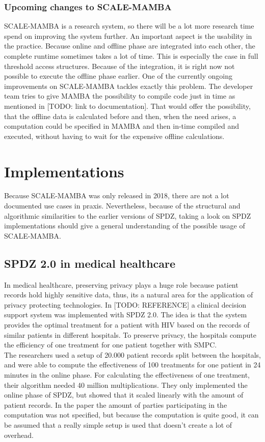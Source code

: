 \documentclass[english,runningheads,a4paper]{llncs}[2018/03/10]
\begin{document}
\subsubsection{Upcoming changes to SCALE-MAMBA}
SCALE-MAMBA is a research system, so there will be a lot more research time spend on improving the system further. An important aspect is the usability in the practice. Because online and offline phase are integrated into each other, the complete runtime sometimes takes a lot of time. This is especially the case in full threshold access structures. Because of the integration, it is right now not possible to execute the offline phase earlier. One of the currently ongoing improvements on SCALE-MAMBA tackles exactly this problem. The developer team tries to give MAMBA the possibility to compile code just in time as mentioned in [TODO: link to documentation]. That would offer the possibility, that the offline data is calculated before and then, when the need arises, a computation could be specified in MAMBA and then in-time compiled and executed, without having to wait for the expensive offline calculations.\\

\section{Implementations}
Because SCALE-MAMBA was only released in 2018, there are not a lot documented use cases in praxis. Nevertheless, because of the structural and algorithmic similarities to the earlier versions of SPDZ, taking a look on SPDZ implementations should give a general understanding of the possible usage of SCALE-MAMBA.\\

\subsection{SPDZ 2.0 in medical healthcare}
In medical healthcare, preserving privacy plays a huge role because patient records hold highly sensitive data, thus, its a natural area for the application of privacy protecting technologies. In [TODO: REFERENCE] a clinical decision support system was implemented with SPDZ 2.0. The idea is that the system provides the optimal treatment for a patient with HIV based on the  records of similar patients in different hospitals. To preserve privacy, the hospitals compute the efficiency of one treatment for one patient together with SMPC.\\
The researchers used a setup of 20.000 patient records split between the hospitals, and were able to compute the effectiveness of 100 treatments for one patient in 24 minutes in the online phase. For calculating the effectiveness of one treatment, their algorithm needed 40 million multiplications. They only implemented the online phase of SPDZ, but showed that it scaled linearly with the amount of patient records. In the paper the amount of parties participating in the computation was not specified, but because the computation is quite good, it can be assumed that a really simple setup is used that doesn't create a lot of overhead.
\end{document}
